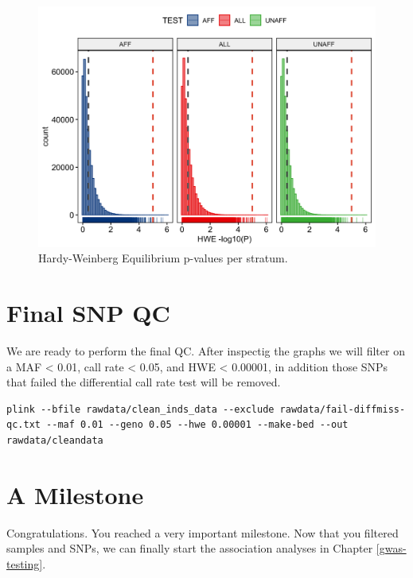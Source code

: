 \documentclass[
]{book}
\begin{document}
\begin{figure}

{\centering \includegraphics[width=18.67in]{img/_gwas/show-hwe} 

}

\caption{Hardy-Weinberg Equilibrium p-values per stratum.}\label{fig:show-hwe}
\end{figure}

\hypertarget{final-snp-qc}{%
\section{Final SNP QC}\label{final-snp-qc}}

We are ready to perform the final QC. After inspectig the graphs we will filter on a MAF \textless{} 0.01, call rate \textless{} 0.05, and HWE \textless{} 0.00001, in addition those SNPs that failed the differential call rate test will be removed.

\begin{lstlisting}
plink --bfile rawdata/clean_inds_data --exclude rawdata/fail-diffmiss-qc.txt --maf 0.01 --geno 0.05 --hwe 0.00001 --make-bed --out rawdata/cleandata
\end{lstlisting}

\hypertarget{a-milestone}{%
\section{A Milestone}\label{a-milestone}}

Congratulations. You reached a very important milestone. Now that you filtered samples and SNPs, we can finally start the association analyses in Chapter \ref{gwas-testing}.
\end{document}
